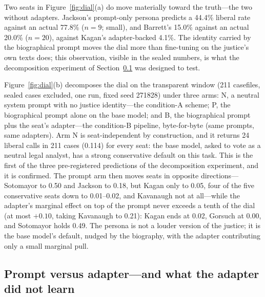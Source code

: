 Two seats in Figure~\ref{fig:dial}(a) do move materially toward the
truth---the two without adapters. Jackson's prompt-only persona
predicts a 44.4\% liberal rate against an actual 77.8\% ($n=9$;
small), and Barrett's 15.0\% against an actual 20.0\% ($n=20$),
against Kagan's adapter-backed 4.1\%. The identity carried by the
biographical prompt moves the dial more than fine-tuning on the
justice's own texts does; this observation, visible in the sealed
numbers, is what the decomposition experiment of
Section~\ref{sec:promptsec} was designed to test.

Figure~\ref{fig:dial}(b) decomposes the dial on the transparent window
(211 casefiles, sealed cases excluded, one run, fixed seed 271828)
under three arms: N, a neutral system prompt with no justice
identity---the condition-A scheme; P, the biographical prompt alone on
the base model; and B, the biographical prompt plus the seat's
adapter---the condition-B pipeline, byte-for-byte (same prompts, same
adapters). Arm N is
seat-independent by construction, and it returns 24 liberal calls in
211 cases (0.114) for every seat: the base model, asked to vote as a
neutral legal analyst, has a strong conservative default on this
task. This is the first of the three pre-registered predictions of
the decomposition experiment, and it is confirmed. The prompt arm then
moves seats in opposite directions---Sotomayor to 0.50 and Jackson to
0.18, but Kagan only to 0.05, four of the five conservative seats down
to 0.01--0.02, and Kavanaugh not at all---while the adapter's marginal
effect on top of the prompt never exceeds a tenth of the dial (at most
$+0.10$, taking Kavanaugh to 0.21): Kagan ends at 0.02, Gorsuch at
0.00, and Sotomayor holds 0.49. The persona is not a louder version
of the justice; it is the base model's default, nudged by the
biography, with the adapter contributing only a small marginal pull.

\subsection{Prompt versus adapter---and what the adapter did not
learn}\label{sec:promptsec}

